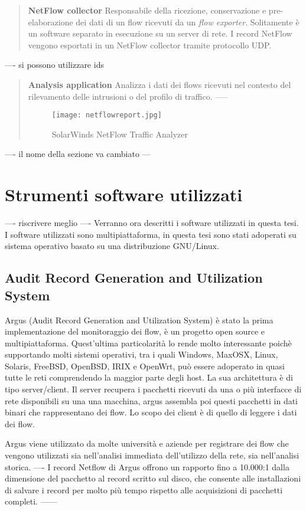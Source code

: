 \documentclass[../main.tex]{subfiles}
\begin{document}
\begin{verse}
\textbf{NetFlow collector}
Responsabile della ricezione, conservazione e pre-elaborazione dei dati di un flow ricevuti da un \textit{flow exporter}. Solitamente è un software separato in esecuzione su un server di rete. I record NetFlow vengono esportati in un NetFlow collector tramite protocollo UDP.
\end{verse}
 ----
 si possono utilizzare ids
\begin{verse}
\textbf{Analysis application} 
Analizza i dati dei flows ricevuti nel contesto del rilevamento delle intrusioni o del profilo di traffico.
-----

\begin{figure}[H]
\centering
\texttt{[image: netflowreport.jpg]}
\caption{SolarWinds NetFlow Traffic Analyzer}
\end{figure}
\end{verse}

---- il nome della sezione va cambiato ---
\section{Strumenti software utilizzati}
---- riscrivere meglio ----
Verranno ora descritti i software utilizzati in questa tesi. I software utilizzati sono multipiattaforma, in questa tesi sono stati adoperati su sistema operativo basato su una distribuzione GNU/Linux.

\subsection{Audit Record Generation and Utilization System}
Argus (Audit Record Generation and Utilization System) è stato la prima implementazione del monitoraggio dei flow, è un progetto open source e multipiattaforma.
Quest'ultima particolarità lo rende molto interessante poichè supportando molti sistemi operativi, tra i quali Windows, MaxOSX, Linux, Solaris, FreeBSD, OpenBSD, IRIX e OpenWrt, può essere adoperato in quasi tutte le reti comprendendo la maggior parte degli host. La sua architettura è di tipo server/client. Il server recupera i pacchetti ricevuti da una o più interfacce di rete disponibili su una una macchina, argus assembla poi questi pacchetti in dati binari che rappresentano dei flow. Lo scopo dei client è di quello di leggere i dati dei flow. \newline

Argus viene utilizzato da molte università e aziende per registrare dei flow che vengono utilizzati sia nell'analisi immediata dell'utilizzo della rete, sia nell'analisi storica.
----
I record Netflow di Argus offrono un rapporto fino a 10.000:1 dalla dimensione del pacchetto al record scritto sul disco, che consente alle installazioni di salvare i record per molto più tempo rispetto alle acquisizioni di pacchetti completi. \newline
------
\end{document}
